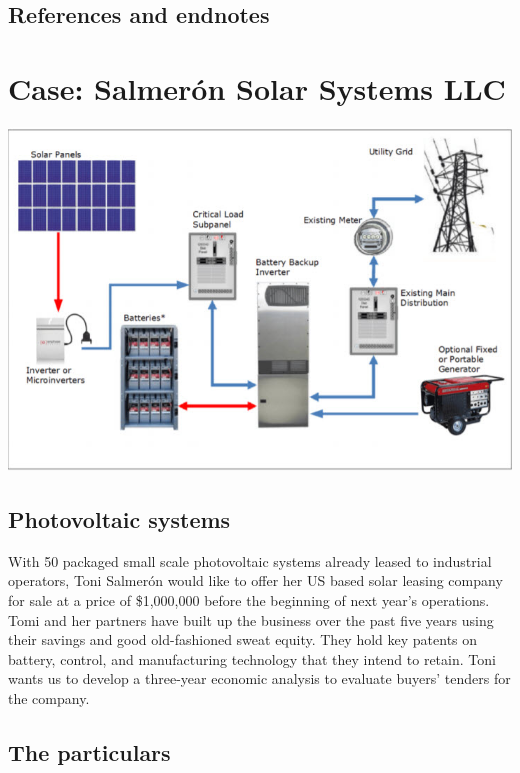 \documentclass[
]{book}
\begin{document}
\hypertarget{references-and-endnotes}{%
\section{References and endnotes}\label{references-and-endnotes}}

\hypertarget{case-salmeruxf3n-solar-systems-llc}{%
\chapter{Case: Salmerón Solar Systems LLC}\label{case-salmeruxf3n-solar-systems-llc}}

\includegraphics{images/02/solar-system.jpg}

\hypertarget{photovoltaic-systems}{%
\section{Photovoltaic systems}\label{photovoltaic-systems}}

With 50 packaged small scale photovoltaic systems already leased to industrial operators, Toni Salmerón would like to offer her US based solar leasing company for sale at a price of \$1,000,000 before the beginning of next year's operations. Tomi and her partners have built up the business over the past five years using their savings and good old-fashioned sweat equity. They hold key patents on battery, control, and manufacturing technology that they intend to retain. Toni wants us to develop a three-year economic analysis to evaluate buyers' tenders for the company.

\hypertarget{the-particulars}{%
\section{The particulars}\label{the-particulars}}
\end{document}
